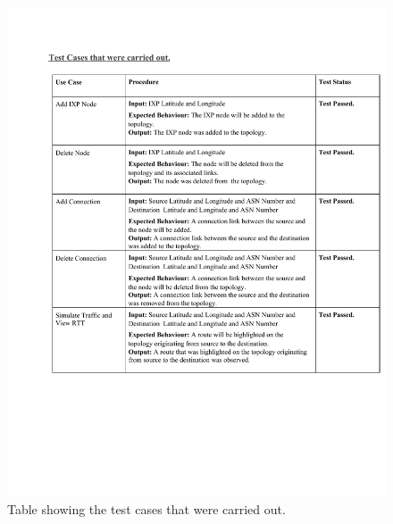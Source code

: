 \begin{figure}
		\centering
		\includegraphics[width=1\linewidth]{Testing procedures.docx.pdf}
		\caption{Table showing the test cases that were carried out.}
		 \label{figure:state}
	\end{figure}